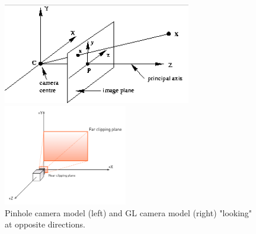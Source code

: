 \begin{figure} 
\centering   
\begin{minipage}[t]{0.45\textwidth}
\includegraphics[width=\linewidth, height=4.4cm]{schemas/hz_camera}
\end{minipage}
\begin{minipage}[t]{0.45\textwidth}
\includegraphics[width=\linewidth, height=4.4cm]{schemas/gl_camera}
\end{minipage}
\caption{Pinhole camera model (left) and GL camera model (right) "looking" at opposite directions.}
\label{fig:stereo_eye_camera_comparison}
\end{figure}

